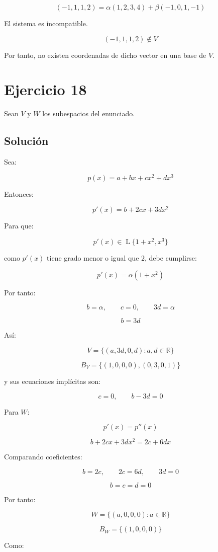 \documentclass[11pt,a4paper]{article}
\newcommand{\R}{\mathbb{R}}
\newcommand{\Span}{\operatorname{L}}
\begin{document}
	\[
	(-1,1,1,2)
	=
	\alpha(1,2,3,4)
	+
	\beta(-1,0,1,-1)
	\]

	El sistema es incompatible.

	\[
	\boxed{
	(-1,1,1,2)\notin V
	}
	\]

	Por tanto, no existen coordenadas de dicho vector en una base de $V$.

\section{Ejercicio 18}
	Sean $V$ y $W$ los subespacios del enunciado.

	\subsection{Solución}

	Sea:

	\[
	p(x)=a+bx+cx^2+dx^3
	\]

	Entonces:

	\[
	p'(x)=b+2cx+3dx^2
	\]

	Para que:

	\[
	p'(x)\in
	\Span\{1+x^2,x^3\}
	\]

	como $p'(x)$ tiene grado menor o igual que $2$, debe cumplirse:

	\[
	p'(x)=\alpha(1+x^2)
	\]

	Por tanto:

	\[
	b=\alpha,
	\qquad
	c=0,
	\qquad
	3d=\alpha
	\]

	\[
	b=3d
	\]

	Así:

	\[
	V=
	\{(a,3d,0,d):a,d\in\R\}
	\]

	\[
	\boxed{
	B_V=
	\{(1,0,0,0),(0,3,0,1)\}
	}
	\]

	y sus ecuaciones implícitas son:

	\[
	\boxed{
	c=0,
	\qquad
	b-3d=0
	}
	\]

	Para $W$:

	\[
	p'(x)=p''(x)
	\]

	\[
	b+2cx+3dx^2
	=
	2c+6dx
	\]

	Comparando coeficientes:

	\[
	b=2c,
	\qquad
	2c=6d,
	\qquad
	3d=0
	\]

	\[
	b=c=d=0
	\]

	Por tanto:

	\[
	W=
	\{(a,0,0,0):a\in\R\}
	\]

	\[
	\boxed{
	B_W=\{(1,0,0,0)\}
	}
	\]

	Como:
\end{document}
